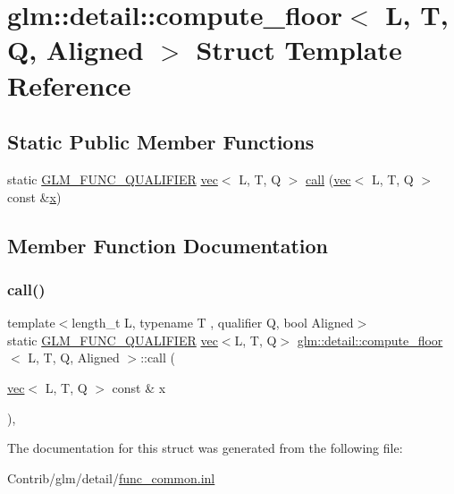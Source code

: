 \hypertarget{structglm_1_1detail_1_1compute__floor}{}\section{glm\+:\+:detail\+:\+:compute\+\_\+floor$<$ L, T, Q, Aligned $>$ Struct Template Reference}
\label{structglm_1_1detail_1_1compute__floor}
\subsection*{Static Public Member Functions}
\begin{DoxyCompactItemize}
\item 
static \mbox{\hyperlink{setup_8hpp_a33fdea6f91c5f834105f7415e2a64407}{G\+L\+M\+\_\+\+F\+U\+N\+C\+\_\+\+Q\+U\+A\+L\+I\+F\+I\+ER}} \mbox{\hyperlink{structglm_1_1vec}{vec}}$<$ L, T, Q $>$ \mbox{\hyperlink{structglm_1_1detail_1_1compute__floor_aa34d64f5823c463b6358bd11038d320e}{call}} (\mbox{\hyperlink{structglm_1_1vec}{vec}}$<$ L, T, Q $>$ const \&\mbox{\hyperlink{_s_d_l__opengl_8h_ad0e63d0edcdbd3d79554076bf309fd47}{x}})
\end{DoxyCompactItemize}


\subsection{Member Function Documentation}
\mbox{\label{structglm_1_1detail_1_1compute__floor_aa34d64f5823c463b6358bd11038d320e}} 
\subsubsection{\texorpdfstring{call()}{call()}}
{\footnotesize\ttfamily template$<$length\+\_\+t L, typename T , qualifier Q, bool Aligned$>$ \\
static \mbox{\hyperlink{setup_8hpp_a33fdea6f91c5f834105f7415e2a64407}{G\+L\+M\+\_\+\+F\+U\+N\+C\+\_\+\+Q\+U\+A\+L\+I\+F\+I\+ER}} \mbox{\hyperlink{structglm_1_1vec}{vec}}$<$L, T, Q$>$ \mbox{\hyperlink{structglm_1_1detail_1_1compute__floor}{glm\+::detail\+::compute\+\_\+floor}}$<$ L, T, Q, Aligned $>$\+::call (\begin{DoxyParamCaption}\item[{\mbox{\hyperlink{structglm_1_1vec}{vec}}$<$ L, T, Q $>$ const \&}]{x }\end{DoxyParamCaption})\hspace{0.3cm}{\ttfamily [inline]}, {\ttfamily [static]}}



The documentation for this struct was generated from the following file\+:\begin{DoxyCompactItemize}
\item 
Contrib/glm/detail/\mbox{\hyperlink{func__common_8inl}{func\+\_\+common.\+inl}}\end{DoxyCompactItemize}
